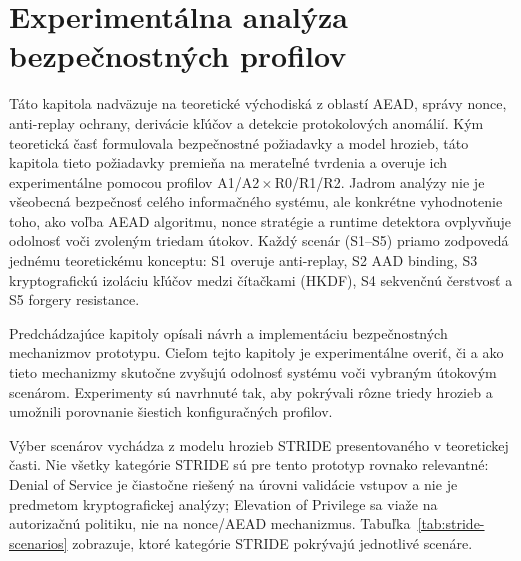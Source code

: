 
\section{Experimentálna analýza bezpečnostných profilov}
\label{sec:experiments}

Táto kapitola nadväzuje na teoretické východiská z oblastí AEAD, správy nonce, anti-replay ochrany, derivácie kľúčov a detekcie protokolových anomálií. Kým teoretická časť formulovala bezpečnostné požiadavky a model hrozieb, táto kapitola tieto požiadavky premieňa na merateľné tvrdenia a overuje ich experimentálne pomocou profilov A1/A2\,$\times$\,R0/R1/R2. Jadrom analýzy nie je všeobecná bezpečnosť celého informačného systému, ale konkrétne vyhodnotenie toho, ako voľba AEAD algoritmu, nonce stratégie a runtime detektora ovplyvňuje odolnosť voči zvoleným triedam útokov. Každý scenár (S1--S5) priamo zodpovedá jednému teoretickému konceptu: S1 overuje anti-replay, S2 AAD binding, S3 kryptografickú izoláciu kľúčov medzi čítačkami (HKDF), S4 sekvenčnú čerstvosť a S5 forgery resistance.

Predchádzajúce kapitoly opísali návrh a implementáciu bezpečnostných mechanizmov prototypu. Cieľom tejto kapitoly je experimentálne overiť, či a ako tieto mechanizmy skutočne zvyšujú odolnosť systému voči vybraným útokovým scenárom. Experimenty sú navrhnuté tak, aby pokrývali rôzne triedy hrozieb a umožnili porovnanie šiestich konfiguračných profilov.

Výber scenárov vychádza z modelu hrozieb STRIDE\cite{STRIDE} presentovaného v teoretickej časti. Nie všetky kategórie STRIDE sú pre tento prototyp rovnako relevantné: Denial of Service je čiastočne riešený na úrovni validácie vstupov a nie je predmetom kryptografickej analýzy; Elevation of Privilege sa viaže na autorizačnú politiku, nie na nonce/AEAD mechanizmus. Tabuľka~\ref{tab:stride-scenarios} zobrazuje, ktoré kategórie STRIDE pokrývajú jednotlivé scenáre.

